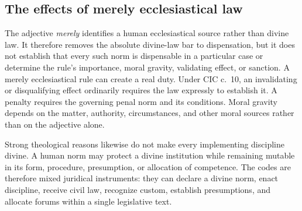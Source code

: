 \subsection{The effects of merely ecclesiastical law}

The adjective \emph{merely} identifies a human ecclesiastical source rather than divine law. It therefore removes the absolute divine-law bar to dispensation, but it does not establish that every such norm is dispensable in a particular case or determine the rule's importance, moral gravity, validating effect, or sanction. A merely ecclesiastical rule can create a real duty. Under CIC c.~10, an invalidating or disqualifying effect ordinarily requires the law expressly to establish it. A penalty requires the governing penal norm and its conditions. Moral gravity depends on the matter, authority, circumstances, and other moral sources rather than on the adjective alone.

Strong theological reasons likewise do not make every implementing discipline divine. A human norm may protect a divine institution while remaining mutable in its form, procedure, presumption, or allocation of competence. The codes are therefore mixed juridical instruments: they can declare a divine norm, enact discipline, receive civil law, recognize custom, establish presumptions, and allocate forums within a single legislative text.

